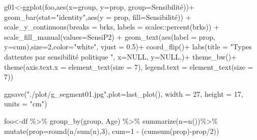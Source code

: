 \documentclass[
]{book}
\newenvironment{Shaded}{\begin{snugshade}}{\end{snugshade}}
\newcommand{\AttributeTok}[1]{\textcolor[rgb]{0.77,0.63,0.00}{#1}}
\newcommand{\ConstantTok}[1]{\textcolor[rgb]{0.00,0.00,0.00}{#1}}
\newcommand{\DecValTok}[1]{\textcolor[rgb]{0.00,0.00,0.81}{#1}}
\newcommand{\FloatTok}[1]{\textcolor[rgb]{0.00,0.00,0.81}{#1}}
\newcommand{\FunctionTok}[1]{\textcolor[rgb]{0.00,0.00,0.00}{#1}}
\newcommand{\NormalTok}[1]{#1}
\newcommand{\OtherTok}[1]{\textcolor[rgb]{0.56,0.35,0.01}{#1}}
\newcommand{\SpecialCharTok}[1]{\textcolor[rgb]{0.00,0.00,0.00}{#1}}
\newcommand{\StringTok}[1]{\textcolor[rgb]{0.31,0.60,0.02}{#1}}
\begin{document}
\begin{Shaded}
\begin{Highlighting}[]
\NormalTok{g01}\OtherTok{\textless{}{-}}\FunctionTok{ggplot}\NormalTok{(foo,}\FunctionTok{aes}\NormalTok{(}\AttributeTok{x=}\NormalTok{group, }\AttributeTok{y=}\NormalTok{prop, }\AttributeTok{group=}\NormalTok{Sensibilité))}\SpecialCharTok{+}
  \FunctionTok{geom\_bar}\NormalTok{(}\AttributeTok{stat=}\StringTok{"identity"}\NormalTok{,}\FunctionTok{aes}\NormalTok{(}\AttributeTok{y =}\NormalTok{ prop, }\AttributeTok{fill=}\NormalTok{Sensibilité)) }\SpecialCharTok{+} 
 \FunctionTok{scale\_y\_continuous}\NormalTok{(}\AttributeTok{breaks =}\NormalTok{ brks, }\AttributeTok{labels =}\NormalTok{ scales}\SpecialCharTok{::}\FunctionTok{percent}\NormalTok{(brks)) }\SpecialCharTok{+}
  \FunctionTok{scale\_fill\_manual}\NormalTok{(}\AttributeTok{values=}\NormalTok{SensiP2) }\SpecialCharTok{+} 
  \FunctionTok{geom\_text}\NormalTok{(}\FunctionTok{aes}\NormalTok{(}\AttributeTok{label =}\NormalTok{ prop, }\AttributeTok{y=}\NormalTok{cum),}\AttributeTok{size=}\DecValTok{2}\NormalTok{,}\AttributeTok{color=}\StringTok{"white"}\NormalTok{, }\AttributeTok{vjust =} \FloatTok{0.5}\NormalTok{)}\SpecialCharTok{+}
  \FunctionTok{coord\_flip}\NormalTok{()}\SpecialCharTok{+}
  \FunctionTok{labs}\NormalTok{(}\AttributeTok{title =} \StringTok{"Types d\textquotesingle{}attentes par sensibilité politique "}\NormalTok{, }
       \AttributeTok{x=}\ConstantTok{NULL}\NormalTok{, }\AttributeTok{y=}\ConstantTok{NULL}\NormalTok{,)}\SpecialCharTok{+}
  \FunctionTok{theme\_bw}\NormalTok{()}\SpecialCharTok{+}  \FunctionTok{theme}\NormalTok{(}\AttributeTok{axis.text.x =} \FunctionTok{element\_text}\NormalTok{(}\AttributeTok{size =} \DecValTok{7}\NormalTok{), }\AttributeTok{legend.text =} \FunctionTok{element\_text}\NormalTok{(}\AttributeTok{size =} \DecValTok{7}\NormalTok{)) }



\FunctionTok{ggsave}\NormalTok{(}\StringTok{"./plot/g\_segment01.jpg"}\NormalTok{,}\AttributeTok{plot=}\FunctionTok{last\_plot}\NormalTok{(), }\AttributeTok{width =} \DecValTok{27}\NormalTok{, }\AttributeTok{height =} \DecValTok{17}\NormalTok{, }\AttributeTok{units =} \StringTok{"cm"}\NormalTok{)}


\NormalTok{foo}\OtherTok{\textless{}{-}}\NormalTok{df }\SpecialCharTok{\%\textgreater{}\%} 
  \FunctionTok{group\_by}\NormalTok{(group, Age) }\SpecialCharTok{\%\textgreater{}\%} 
   \FunctionTok{summarize}\NormalTok{(}\AttributeTok{n=}\FunctionTok{n}\NormalTok{())}\SpecialCharTok{\%\textgreater{}\%}
  \FunctionTok{mutate}\NormalTok{(}\AttributeTok{prop=}\FunctionTok{round}\NormalTok{(n}\SpecialCharTok{/}\FunctionTok{sum}\NormalTok{(n),}\DecValTok{3}\NormalTok{), }\AttributeTok{cum=}\DecValTok{1} \SpecialCharTok{{-}}\NormalTok{ (}\FunctionTok{cumsum}\NormalTok{(prop)}\SpecialCharTok{{-}}\NormalTok{prop}\SpecialCharTok{/}\DecValTok{2}\NormalTok{))}


\end{Highlighting}
\end{Shaded}
\end{document}
